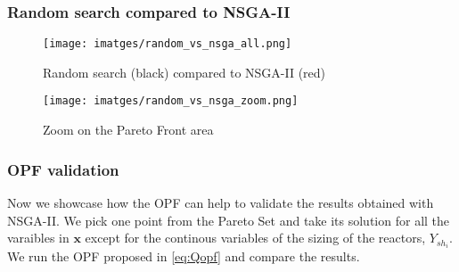\documentclass[a4paper,11pt, titlepage, twoside]{article}
\begin{document}
\subsubsection{Random search compared to NSGA-II}

\begin{figure}[H]
    \centering
    \texttt{[image: imatges/random\_vs\_nsga\_all.png]}
    \caption{Random search (black) compared to NSGA-II (red)}
    \label{fig:searchall}
\end{figure}
    
\begin{figure}[H]
    \centering
    \texttt{[image: imatges/random\_vs\_nsga\_zoom.png]}
    \caption{Zoom on the Pareto Front area}
    \label{fig:paretpnsga}
\end{figure}
\subsubsection{OPF validation}

Now we showcase how the OPF can help to validate the results obtained with NSGA-II. We pick one point from the Pareto Set and  take its solution for all the varaibles in $\mathbf{x}$
except for the continous variables of the sizing of the reactors, $Y_{sh_i}$. We run the OPF proposed in \ref{eq:Qopf} and compare the results.
\end{document}
